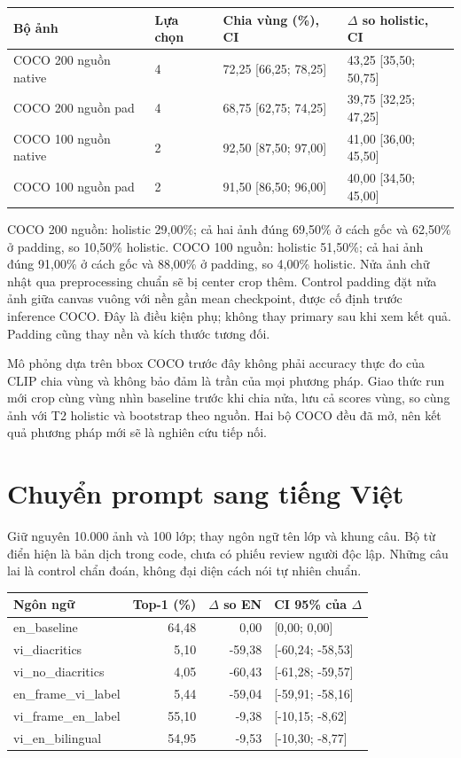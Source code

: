 \documentclass[11pt,a4paper]{article}
\begin{document}
\begin{center}\small
{}
\begin{tabular}{@{}llll@{}}\toprule
Bộ ảnh & Lựa chọn & Chia vùng (\%), CI & $\Delta$ so holistic, CI\\\midrule
COCO 200 nguồn native & 4 & 72,25 [66,25; 78,25] & 43,25 [35,50; 50,75]\\
COCO 200 nguồn pad & 4 & 68,75 [62,75; 74,25] & 39,75 [32,25; 47,25]\\
COCO 100 nguồn native & 2 & 92,50 [87,50; 97,00] & 41,00 [36,00; 45,50]\\
COCO 100 nguồn pad & 2 & 91,50 [86,50; 96,00] & 40,00 [34,50; 45,00]\\
\bottomrule\end{tabular}\end{center}

COCO 200 nguồn: holistic 29,00\%; cả hai ảnh đúng 69,50\% ở cách gốc và 62,50\% ở padding, so 10,50\% holistic. COCO 100 nguồn: holistic 51,50\%; cả hai ảnh đúng 91,00\% ở cách gốc và 88,00\% ở padding, so 4,00\% holistic. Nửa ảnh chữ nhật qua preprocessing chuẩn sẽ bị center crop thêm. Control padding đặt nửa ảnh giữa canvas vuông với nền gần mean checkpoint, được cố định trước inference COCO. Đây là điều kiện phụ; không thay primary sau khi xem kết quả. Padding cũng thay nền và kích thước tương đối.

Mô phỏng dựa trên bbox COCO trước đây không phải accuracy thực đo của CLIP chia vùng và không bảo đảm là trần của mọi phương pháp. Giao thức run mới crop cùng vùng nhìn baseline trước khi chia nửa, lưu cả scores vùng, so cùng ảnh với T2 holistic và bootstrap theo nguồn. Hai bộ COCO đều đã mở, nên kết quả phương pháp mới sẽ là nghiên cứu tiếp nối.

\newpage
\section{Chuyển prompt sang tiếng Việt}
Giữ nguyên 10.000 ảnh và 100 lớp; thay ngôn ngữ tên lớp và khung câu. Bộ từ điển hiện là bản dịch trong code, chưa có phiếu review người độc lập. Những câu lai là control chẩn đoán, không đại diện cách nói tự nhiên chuẩn.

\begin{center}\small
{}
\begin{tabular}{@{}lrrl@{}}\toprule
Ngôn ngữ & Top-1 (\%) & $\Delta$ so EN & CI 95\% của $\Delta$\\\midrule
en\_baseline & 64,48 & 0,00 & [0,00; 0,00]\\
vi\_diacritics & 5,10 & -59,38 & [-60,24; -58,53]\\
vi\_no\_diacritics & 4,05 & -60,43 & [-61,28; -59,57]\\
en\_frame\_vi\_label & 5,44 & -59,04 & [-59,91; -58,16]\\
vi\_frame\_en\_label & 55,10 & -9,38 & [-10,15; -8,62]\\
vi\_en\_bilingual & 54,95 & -9,53 & [-10,30; -8,77]\\
\bottomrule\end{tabular}\end{center}
\end{document}
